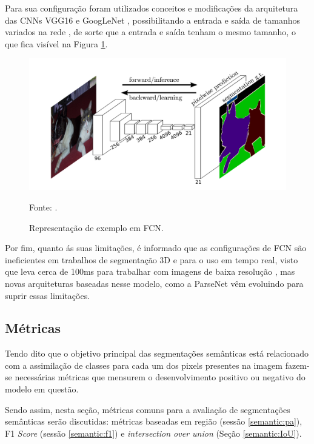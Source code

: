 Para sua configuração foram utilizados conceitos e modificações da arquitetura das CNNs VGG16 \cite{Simonyan2015VeryRecognition} e GoogLeNet \cite{Szegedy2015GoingConvolutions}, possibilitando a entrada e saída de tamanhos variados na rede \cite{Minaee2021}, de sorte que a entrada e saída tenham o mesmo tamanho, o que fica visível na Figura \ref{semantic:fig:6}.

\begin{figure}[H]
    \centering
    \caption{Representação de exemplo em FCN.}
    \includegraphics[width=1\linewidth]{recursos/imagens/semantic/fcn_example.png}
    \label{semantic:fig:6}

    \vspace*{1 cm}
    Fonte: \cite{Shelhamer2016}.
\end{figure}

Por fim, quanto ás suas limitações, é informado que as configurações de FCN são ineficientes em trabalhos de segmentação 3D e para o uso em tempo real, visto que leva cerca de 100ms para trabalhar com imagens de baixa resolução \cite{Minaee2021}, mas novas arquiteturas baseadas nesse modelo, como a ParseNet \cite{Liu2015ParseNet:Better} vêm evoluindo para suprir essas limitações.


\subsection{Métricas}
\label{semantic:metrics}

Tendo dito que o objetivo principal das segmentações semânticas está relacionado com a assimilação de classes para cada um dos pixels presentes na imagem \cite{Csurka} fazem-se necessárias métricas que mensurem o desenvolvimento positivo ou negativo do modelo em questão.

Sendo assim, nesta seção, métricas comuns para a avaliação de segmentações semânticas serão discutidas: métricas baseadas em região (sessão \ref{semantic:pa}), F1 \textit{Score} (sessão \ref{semantic:f1}) e \textit{intersection over union} (Seção \ref{semantic:IoU}).


